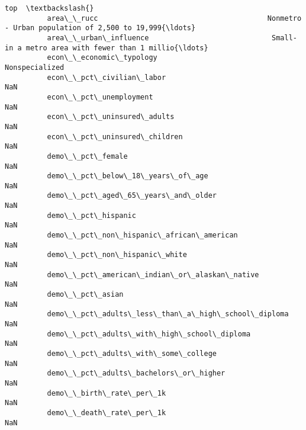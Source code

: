 \documentclass[11pt]{article}
\begin{document}
\begin{Verbatim}[commandchars=\\\{\}]
                                                                                                          top  \textbackslash{}
          area\_\_rucc                                        Nonmetro - Urban population of 2,500 to 19,999{\ldots}   
          area\_\_urban\_influence                             Small-in a metro area with fewer than 1 millio{\ldots}   
          econ\_\_economic\_typology                                                              Nonspecialized   
          econ\_\_pct\_civilian\_labor                                                                        NaN   
          econ\_\_pct\_unemployment                                                                          NaN   
          econ\_\_pct\_uninsured\_adults                                                                      NaN   
          econ\_\_pct\_uninsured\_children                                                                    NaN   
          demo\_\_pct\_female                                                                                NaN   
          demo\_\_pct\_below\_18\_years\_of\_age                                                                 NaN   
          demo\_\_pct\_aged\_65\_years\_and\_older                                                               NaN   
          demo\_\_pct\_hispanic                                                                              NaN   
          demo\_\_pct\_non\_hispanic\_african\_american                                                         NaN   
          demo\_\_pct\_non\_hispanic\_white                                                                    NaN   
          demo\_\_pct\_american\_indian\_or\_alaskan\_native                                                     NaN   
          demo\_\_pct\_asian                                                                                 NaN   
          demo\_\_pct\_adults\_less\_than\_a\_high\_school\_diploma                                                NaN   
          demo\_\_pct\_adults\_with\_high\_school\_diploma                                                       NaN   
          demo\_\_pct\_adults\_with\_some\_college                                                              NaN   
          demo\_\_pct\_adults\_bachelors\_or\_higher                                                            NaN   
          demo\_\_birth\_rate\_per\_1k                                                                         NaN   
          demo\_\_death\_rate\_per\_1k                                                                         NaN   

\end{Verbatim}
\end{document}

